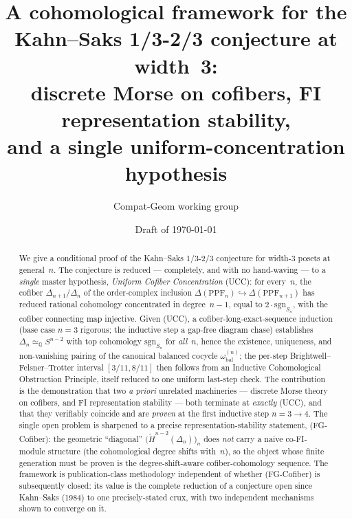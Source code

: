 \documentclass[11pt,reqno]{amsart}
\theoremstyle{plain}
\theoremstyle{definition}
\newcommand{\PPF}{\mathrm{PPF}}
\newcommand{\Hred}{\widetilde H}
\newcommand{\sgn}{\mathrm{sgn}}
\newcommand{\Q}{\mathbb{Q}}
\newcommand{\omegabal}[1]{\omega_{\mathrm{bal}}^{(#1)}}
\newcommand{\UCC}{\textup{(UCC)}}
\newcommand{\FGC}{\textup{(FG-Cofiber)}}
\begin{document}
\title[A cohomological framework for width-3 Kahn--Saks 1/3-2/3]{A cohomological framework for the Kahn--Saks 1/3-2/3 conjecture at width~3:\\ discrete Morse on cofibers, FI representation stability,\\ and a single uniform-concentration hypothesis}

\author{Compat-Geom working group}
\date{Draft of \today}

\begin{abstract}
We give a conditional proof of the Kahn--Saks 1/3-2/3 conjecture for
width-3 posets at general~$n$. The conjecture is reduced --- completely,
and with no hand-waving --- to a \emph{single} master hypothesis,
\emph{Uniform Cofiber Concentration} \UCC: for every~$n$, the cofiber
$\Delta_{n+1}/\Delta_n$ of the order-complex inclusion
$\Delta(\PPF_n)\hookrightarrow\Delta(\PPF_{n+1})$ has reduced rational
cohomology concentrated in degree~$n-1$, equal to $2\cdot\sgn_{S_n}$,
with the cofiber connecting map injective. Given \UCC, a
cofiber-long-exact-sequence induction (base case $n=3$ rigorous; the
inductive step a gap-free diagram chase) establishes
$\Delta_n\simeq_{\Q}S^{n-2}$ with top cohomology $\sgn_{S_n}$ for
\emph{all}~$n$, hence the existence, uniqueness, and non-vanishing
pairing of the canonical balanced cocycle $\omegabal{n}$; the per-step
Brightwell--Felsner--Trotter interval $[3/11,8/11]$ then follows from an
Inductive Cohomological Obstruction Principle, itself reduced to one
uniform last-step check. The contribution is the demonstration that two
\emph{a priori} unrelated machineries --- discrete Morse theory on
cofibers, and FI representation stability --- both terminate at
\emph{exactly} \UCC, and that they verifiably coincide and are
\emph{proven} at the first inductive step $n=3\to4$. The single open
problem is sharpened to a precise representation-stability statement,
\FGC: the geometric ``diagonal'' $\bigl(\Hred^{n-2}(\Delta_n)\bigr)_n$
does \emph{not} carry a naive co-FI-module structure (the cohomological
degree shifts with~$n$), so the object whose finite generation must be
proven is the degree-shift-aware cofiber-cohomology sequence. The
framework is publication-class methodology independent of whether \FGC{}
is subsequently closed: its value is the complete reduction of a
conjecture open since Kahn--Saks (1984) to one precisely-stated crux,
with two independent mechanisms shown to converge on it.
\end{abstract}

\maketitle
\end{document}
